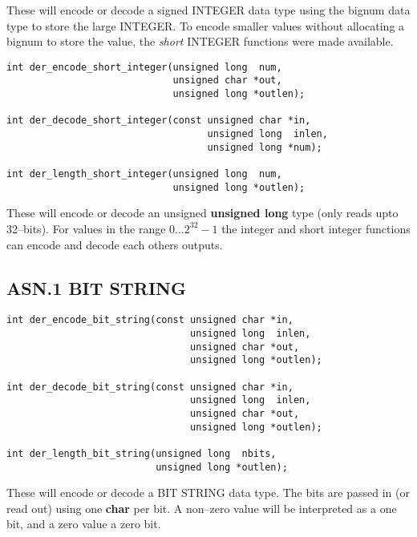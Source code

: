 \documentclass[synpaper]{book}
\begin{document}
These will encode or decode a signed INTEGER data type using the bignum data type to store the large INTEGER.  To encode smaller values without allocating
a bignum to store the value, the \textit{short} INTEGER functions were made available.

\begin{verbatim}
int der_encode_short_integer(unsigned long  num, 
                             unsigned char *out, 
                             unsigned long *outlen);

int der_decode_short_integer(const unsigned char *in,  
                                   unsigned long  inlen, 
                                   unsigned long *num);

int der_length_short_integer(unsigned long  num, 
                             unsigned long *outlen);
\end{verbatim}

These will encode or decode an unsigned \textbf{unsigned long} type (only reads upto 32--bits).  For values in the range $0 \dots 2^{32} - 1$ the integer 
and short integer functions can encode and decode each others outputs.  

\subsection{ASN.1 BIT STRING}

\begin{verbatim}
int der_encode_bit_string(const unsigned char *in, 
                                unsigned long  inlen,
                                unsigned char *out, 
                                unsigned long *outlen);

int der_decode_bit_string(const unsigned char *in, 
                                unsigned long  inlen,
                                unsigned char *out, 
                                unsigned long *outlen);

int der_length_bit_string(unsigned long  nbits, 
                          unsigned long *outlen);
\end{verbatim}

These will encode or decode a BIT STRING data type.  The bits are passed in (or read out) using one \textbf{char} per bit.  A non--zero value will be interpreted
as a one bit, and a zero value a zero bit.
\end{document}
